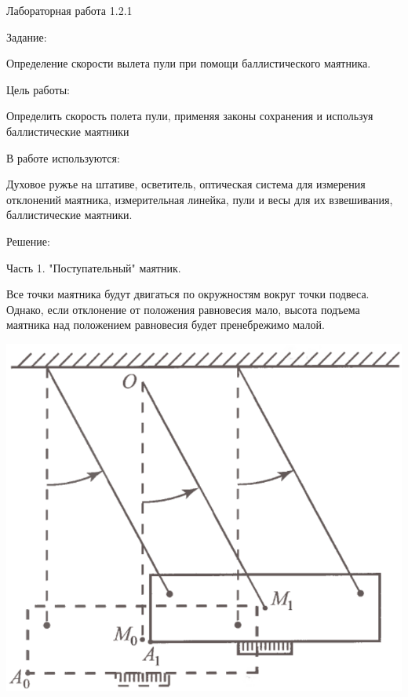\documentclass{astroedu-lab}
\begin{document}
\pagestyle{plain}

\begin{problem}{\large Лабораторная работа 1.2.1}

\begin{bfseries}
	Задание:
\end{bfseries}

Определение скорости вылета пули при помощи баллистического маятника.

\begin{bfseries}
	Цель работы:
\end{bfseries}

Определить скорость полета пули, применяя законы сохранения и используя баллистические маятники

\begin{bfseries}
	В работе используются:
\end{bfseries}

Духовое ружъе на штативе, осветитель, оптическая система для измерения отклонений маятника, измерительная линейка, пули и весы для их взвешивания, баллистические маятники.

\begin{bfseries}
	Решение:
\end{bfseries}

\begin{bfseries}
	Часть 1. "Поступательный" маятник.
\end{bfseries}

Все точки маятника будут двигаться по окружностям вокруг точки подвеса. Однако, если отклонение от положения равновесия мало, высота подъема маятника над положением равновесия будет пренебрежимо малой.

\begin{center}

\includegraphics[width=0.6\linewidth]{pic_theory.png}


\end{center}
\end{problem}
\end{document}
